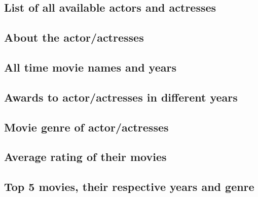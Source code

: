 \documentclass[12pt]{article}
\begin{document}
\subsection{List of all available actors and actresses} \label{list-actors}

\subsection{About the actor/actresses} \label{about}

\subsection{All time movie names and years} \label{movies}

\subsection{Awards to actor/actresses in different years} \label{awards}

\subsection{Movie genre of actor/actresses} \label{genre}

\subsection{Average rating of their movies} \label{average-rating}

\subsection{Top 5 movies, their respective years and genre} \label{top-movies}
\end{document}
